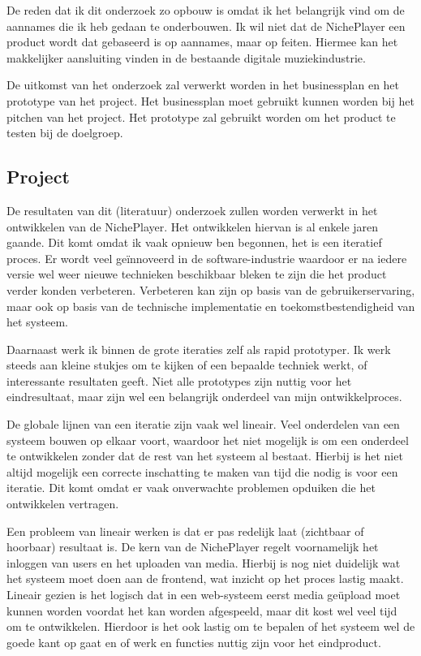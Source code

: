 De reden dat ik dit onderzoek zo opbouw is omdat ik het belangrijk vind om de aannames die ik heb gedaan te onderbouwen. Ik wil niet dat de NichePlayer een product wordt dat gebaseerd is op aannames, maar op feiten. Hiermee kan het makkelijker aansluiting vinden in de bestaande digitale muziekindustrie.


De uitkomst van het onderzoek zal verwerkt worden in het businessplan en het prototype van het project. Het businessplan moet gebruikt kunnen worden bij het pitchen van het project. Het prototype zal gebruikt worden om het product te testen bij de doelgroep.

\subsection{Project}
De resultaten van dit (literatuur) onderzoek zullen worden verwerkt in het ontwikkelen van de NichePlayer. Het ontwikkelen hiervan is al enkele jaren gaande. Dit komt omdat ik vaak opnieuw ben begonnen, het is een iteratief proces. Er wordt veel geïnnoveerd in de software-industrie waardoor er na iedere versie wel weer nieuwe technieken beschikbaar bleken te zijn die het product verder konden verbeteren. Verbeteren kan zijn op basis van de gebruikerservaring, maar ook op basis van de technische implementatie en toekomstbestendigheid van het systeem.

Daarnaast werk ik binnen de grote iteraties zelf als rapid prototyper. Ik werk steeds aan kleine stukjes om te kijken of een bepaalde techniek werkt, of interessante resultaten geeft. Niet alle prototypes zijn nuttig voor het eindresultaat, maar zijn wel een belangrijk onderdeel van mijn ontwikkelproces.

De globale lijnen van een iteratie zijn vaak wel lineair. Veel onderdelen van een systeem bouwen op elkaar voort, waardoor het niet mogelijk is om een onderdeel te ontwikkelen zonder dat de rest van het systeem al bestaat. Hierbij is het niet altijd mogelijk een correcte inschatting te maken van tijd die nodig is voor een iteratie. Dit komt omdat er vaak onverwachte problemen opduiken die het ontwikkelen vertragen.

Een probleem van lineair werken is dat er pas redelijk laat (zichtbaar of hoorbaar) resultaat is. De kern van de NichePlayer regelt voornamelijk het inloggen van users en het uploaden van media. Hierbij is nog niet duidelijk wat het systeem moet doen aan de frontend, wat inzicht op het proces lastig maakt. Lineair gezien is het logisch dat in een web-systeem eerst media geüpload moet kunnen worden voordat het kan worden afgespeeld, maar dit kost wel veel tijd om te ontwikkelen. Hierdoor is het ook lastig om te bepalen of het systeem wel de goede kant op gaat en of werk en functies nuttig zijn voor het eindproduct.

